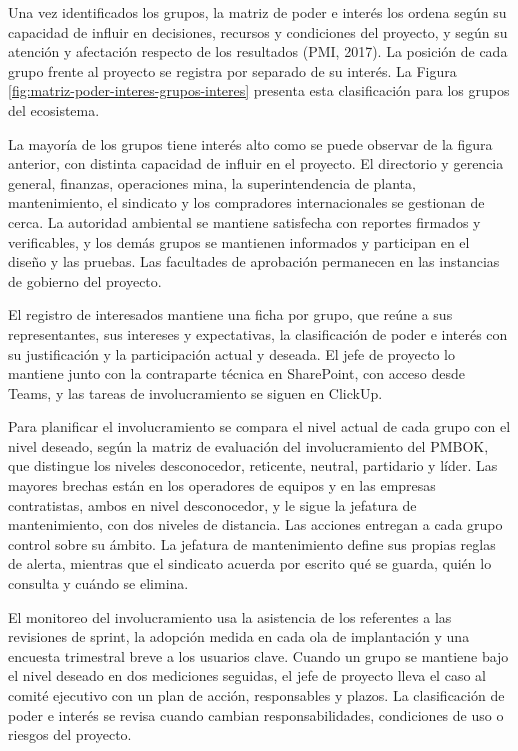 \documentclass[subdoc]{../../comun/overfore}
\begin{document}
Una vez identificados los grupos, la matriz de poder e interés los ordena según su capacidad de influir en decisiones, recursos y condiciones del proyecto, y según su atención y afectación respecto de los resultados (PMI, 2017). La posición de cada grupo frente al proyecto se registra por separado de su interés. La Figura \ref{fig:matriz-poder-interes-grupos-interes} presenta esta clasificación para los grupos del ecosistema.

La mayoría de los grupos tiene interés alto como se puede observar de la figura anterior, con distinta capacidad de influir en el proyecto. El directorio y gerencia general, finanzas, operaciones mina, la superintendencia de planta, mantenimiento, el sindicato y los compradores internacionales se gestionan de cerca. La autoridad ambiental se mantiene satisfecha con reportes firmados y verificables, y los demás grupos se mantienen informados y participan en el diseño y las pruebas. Las facultades de aprobación permanecen en las instancias de gobierno del proyecto.

El registro de interesados mantiene una ficha por grupo, que reúne a sus representantes, sus intereses y expectativas, la clasificación de poder e interés con su justificación y la participación actual y deseada. El jefe de proyecto lo mantiene junto con la contraparte técnica en SharePoint, con acceso desde Teams, y las tareas de involucramiento se siguen en ClickUp.

Para planificar el involucramiento se compara el nivel actual de cada grupo con el nivel deseado, según la matriz de evaluación del involucramiento del PMBOK, que distingue los niveles desconocedor, reticente, neutral, partidario y líder. Las mayores brechas están en los operadores de equipos y en las empresas contratistas, ambos en nivel desconocedor, y le sigue la jefatura de mantenimiento, con dos niveles de distancia. Las acciones entregan a cada grupo control sobre su ámbito. La jefatura de mantenimiento define sus propias reglas de alerta, mientras que el sindicato acuerda por escrito qué se guarda, quién lo consulta y cuándo se elimina.

El monitoreo del involucramiento usa la asistencia de los referentes a las revisiones de sprint, la adopción medida en cada ola de implantación y una encuesta trimestral breve a los usuarios clave. Cuando un grupo se mantiene bajo el nivel deseado en dos mediciones seguidas, el jefe de proyecto lleva el caso al comité ejecutivo con un plan de acción, responsables y plazos. La clasificación de poder e interés se revisa cuando cambian responsabilidades, condiciones de uso o riesgos del proyecto.
\end{document}
